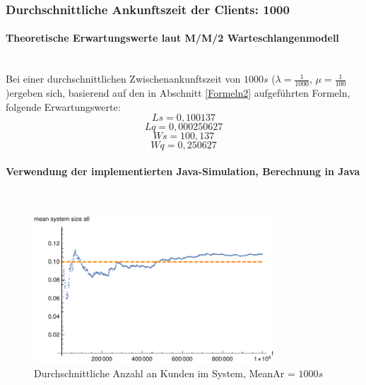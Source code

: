 \subsubsection{Durchschnittliche Ankunftszeit der Clients: 1000}
\paragraph{Theoretische Erwartungswerte laut M/M/2 Warteschlangenmodell}
\\
Bei einer durchschnittlichen Zwischenankunftszeit von $1000s$ ($\lambda=\frac{1}{1000}$, $\mu=\frac{1}{100}$)ergeben sich, basierend auf den in Abschnitt \ref{Formeln2} aufgeführten Formeln, folgende Erwartungswerte:
\begin{equation}
Ls=0,100137
\end{equation}
\begin{equation}
Lq=0,000250627
\end{equation}
\begin{equation}
Ws=100,137
\end{equation}
\begin{equation}
Wq=0,250627
\end{equation}

\paragraph{Verwendung der implementierten Java-Simulation, Berechnung in Java}
\label{JavaTwoPhones1000}
\\
\begin{figure}[htpb]
	\centering
	\includegraphics[width=0.8\textwidth]{abbildungen/2_Phone_VIP/Arrival_1000_Serve_100_dur_1000000_Skip_0/MeanSystemSizeAll.pdf}
	\caption{Durchschnittliche Anzahl an Kunden im System, MeanAr = $1000s$}
	\label{fig:mean3SystemSize1000}
\end{figure}

